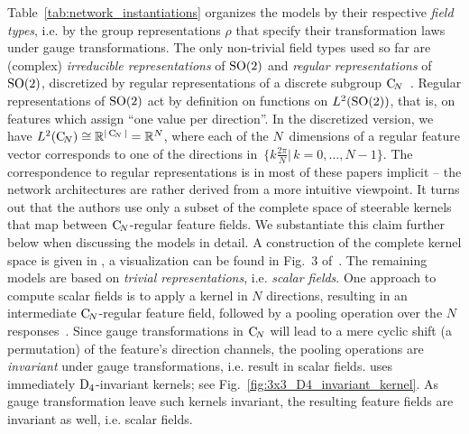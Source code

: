 Table~\ref{tab:network_instantiations} organizes the models by their respective \emph{field types}, i.e. by the group representations $\rho$ that specify their transformation laws under gauge transformations.
The only non-trivial field types used so far are (complex) \emph{irreducible representations} of $\operatorname{SO}(2)$ \cite{Wiersma2020} and \emph{regular representations} of $\operatorname{SO}(2)$, discretized by regular representations of a discrete subgroup $\operatorname{C}_{\!N}$~\cite{poulenard2018multi,sun2018zernet,deHaan2020meshCNNs,Yang2020parallelFrameCNN}.
Regular representations of $\operatorname{SO}(2)$ act by definition on functions on $L^2(\operatorname{SO}(2))$, that is, on features which assign ``one value per direction''.
In the discretized version, we have $L^2(\operatorname{C}_{\!N}) \cong \mathbb{R}^{|\operatorname{C}_{\!N}|} = \mathbb{R}^N$, where each of the $N$~dimensions of a regular feature vector corresponds to one of the directions in~$\big\{ k\frac{2\pi}{N} \big|\, k=0,\dots,N-1 \big\}$.
The correspondence to regular representations is in most of these papers implicit -- the network architectures are rather derived from a more intuitive viewpoint.
It turns out that the authors use only a subset of the complete space of steerable kernels that map between $\operatorname{C}_{\!N}$-regular feature fields.
We substantiate this claim further below when discussing the models in detail.
A construction of the complete kernel space is given in \cite{Weiler2019_E2CNN}, a visualization can be found in Fig.~3 of~\cite{Weiler2018SFCNN}.
The remaining models are based on \emph{trivial representations}, i.e. \emph{scalar fields}.
One approach to compute scalar fields is to apply a kernel in $N$ directions, resulting in an intermediate $\operatorname{C}_{\!N}$-regular feature field, followed by a pooling operation over the $N$ responses~\cite{masci2015geodesic,monti2017geometric,sun2018zernet}.
Since gauge transformations in $\operatorname{C}_{\!N}$ will lead to a mere cyclic shift (a permutation) of the feature's direction channels, the pooling operations are \emph{invariant} under gauge transformations, i.e. result in scalar fields.
\citet{huang2019texturenet} uses immediately $\operatorname{D}_{4}$-invariant kernels; see Fig.~\ref{fig:3x3_D4_invariant_kernel}.
As gauge transformation leave such kernels invariant, the resulting feature fields are invariant as well, i.e. scalar fields.


